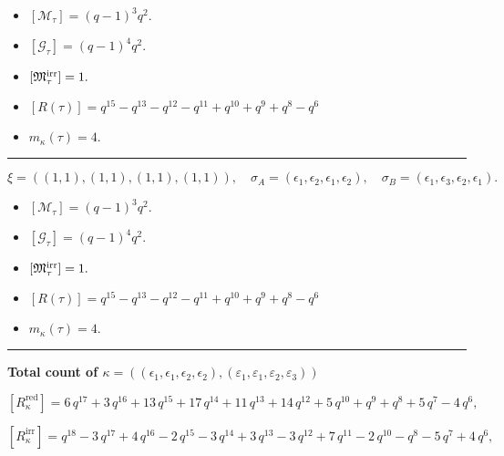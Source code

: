 \documentclass[10pt,a4paper]{amsart}
\begin{document}
\begin{itemize}
 \item $[\mathcal{M}_{\tau}] = {\left(q - 1\right)}^{3} q^{2} .$

 \item $[\mathcal{G}_{\tau}] = {\left(q - 1\right)}^{4} q^{2} .$

 \item $[{\frak M}_{\tau}^{\textrm{irr}}] = 1 .$

 \item $[R(\tau)] = q^{15} - q^{13} - q^{12} - q^{11} + q^{10} + q^{9} + q^{8} - q^{6} $

 \item $m_{\kappa}(\tau) = 4 .$

 \end{itemize}
\noindent\rule{8cm}{0.4pt}

$$\xi = ({(1, 1)}, {(1, 1)}, {(1, 1)}, {(1, 1)}),\quad \sigma_A = ({{\epsilon_1}}, {{\epsilon_2}}, {{\epsilon_1}}, {{\epsilon_2}}),\quad \sigma_B = ({{\epsilon_1}}, {{\epsilon_3}}, {{\epsilon_2}}, {{\epsilon_1}}).$$

\begin{itemize}
 \item $[\mathcal{M}_{\tau}] = {\left(q - 1\right)}^{3} q^{2} .$

 \item $[\mathcal{G}_{\tau}] = {\left(q - 1\right)}^{4} q^{2} .$

 \item $[{\frak M}_{\tau}^{\textrm{irr}}] = 1 .$

 \item $[R(\tau)] = q^{15} - q^{13} - q^{12} - q^{11} + q^{10} + q^{9} + q^{8} - q^{6} $

 \item $m_{\kappa}(\tau) = 4 .$

 \end{itemize}
\noindent\rule{9cm}{2pt}\vspace{0.2cm}

\noindent\textbf{Total count of $\kappa = ((\epsilon_1,\epsilon_1,\epsilon_2,\epsilon_2), (\varepsilon_1,\varepsilon_1,\varepsilon_2,\varepsilon_3))$}\medskip

${[R_{\kappa}^{\textrm{red}}]} = 6 \, q^{17} + 3 \, q^{16} + 13 \, q^{15} + 17 \, q^{14} + 11 \, q^{13} + 14 \, q^{12} + 5 \, q^{10} + q^{9} + q^{8} + 5 \, q^{7} - 4 \, q^{6} ,$

${[R_{\kappa}^{\textrm{irr}}]} = q^{18} - 3 \, q^{17} + 4 \, q^{16} - 2 \, q^{15} - 3 \, q^{14} + 3 \, q^{13} - 3 \, q^{12} + 7 \, q^{11} - 2 \, q^{10} - q^{8} - 5 \, q^{7} + 4 \, q^{6} ,$
\end{document}
